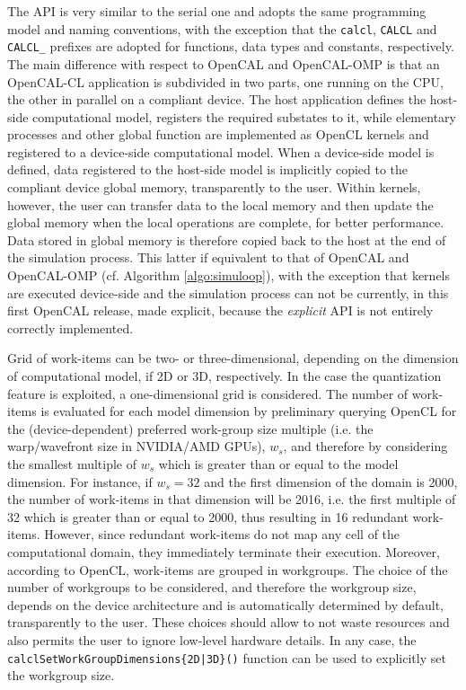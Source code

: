 The API is very similar to the serial one and adopts the same
programming model and naming conventions, with the exception that
the \verb'calcl', \verb'CALCL' and \verb'CALCL_' prefixes are
adopted for functions, data types and constants, respectively. The
main difference with respect to OpenCAL and OpenCAL-OMP is that an
OpenCAL-CL application is subdivided in two parts, one running on
the CPU, the other in parallel on a compliant device. The host
application defines the host-side computational model, registers the
required substates to it, while elementary processes and other
global function are implemented as OpenCL kernels and registered to
a device-side computational model. When a device-side model is
defined, data registered to the host-side model is implicitly copied
to the compliant device global memory, transparently to the
user. Within kernels, however, the user can transfer data to the
local memory and then update the global memory when the local
operations are complete, for better performance. Data stored in
global memory is therefore copied back to the host at the end of
the simulation process. This latter if equivalent to that of OpenCAL
and OpenCAL-OMP (cf. Algorithm \ref{algo:simuloop}), with the
exception that kernels are executed device-side and the simulation
process can not be currently, in this first OpenCAL release, made explicit, because the \textit{explicit} API is not entirely correctly implemented.

Grid of work-items can be two- or three-dimensional, depending on
the dimension of computational model, if 2D or 3D, respectively. In
the case the quantization feature is exploited, a one-dimensional
grid is considered. The number of work-items is evaluated for each
model dimension by preliminary querying OpenCL for the
(device-dependent) preferred work-group size multiple (i.e. the
warp/wavefront size in NVIDIA/AMD GPUs), $w_s$, and therefore by
considering the smallest multiple of $w_s$ which is greater than or
equal to the model dimension. For instance, if $w_s=32$ and the
first dimension of the domain is 2000, the number of work-items in
that dimension will be 2016, i.e. the first multiple of 32 which is
greater than or equal to 2000, thus resulting in 16 redundant
work-items. However, since redundant work-items do not map any cell
of the computational domain, they immediately terminate their
execution. Moreover, according to OpenCL, work-items are grouped in
workgroups. The choice of the number of workgroups to be considered,
and therefore the workgroup size, depends on the device architecture
and is automatically determined by default, transparently to the
user. These choices should allow to not waste resources and also
permits the user to ignore low-level hardware details. In any case,
the \verb'calclSetWorkGroupDimensions{2D|3D}()' function can be used
to explicitly set the workgroup size.

